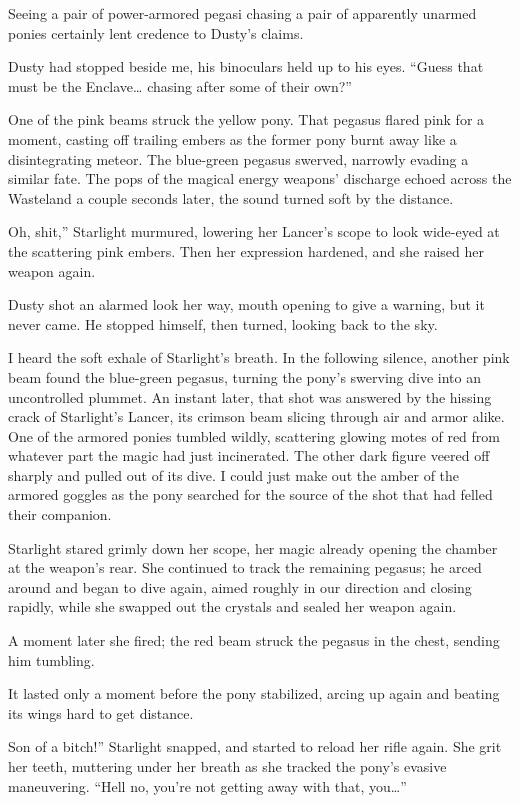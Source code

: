 Seeing a pair of power-armored pegasi chasing a pair of apparently unarmed ponies certainly lent credence to Dusty’s claims.

Dusty had stopped beside me, his binoculars held up to his eyes. “Guess that must be the Enclave… chasing after some of their own?”

One of the pink beams struck the yellow pony. That pegasus flared pink for a moment, casting off trailing embers as the former pony burnt away like a disintegrating meteor. The blue-green pegasus swerved, narrowly evading a similar fate. The pops of the magical energy weapons’ discharge echoed across the Wasteland a couple seconds later, the sound turned soft by the distance.

\leavevmode{}Oh, shit,” Starlight murmured, lowering her Lancer’s scope to look wide-eyed at the scattering pink embers. Then her expression hardened, and she raised her weapon again.

Dusty shot an alarmed look her way, mouth opening to give a warning, but it never came. He stopped himself, then turned, looking back to the sky.

I heard the soft exhale of Starlight’s breath. In the following silence, another pink beam found the blue-green pegasus, turning the pony’s swerving dive into an uncontrolled plummet. An instant later, that shot was answered by the hissing crack of Starlight’s Lancer, its crimson beam slicing through air and armor alike. One of the armored ponies tumbled wildly, scattering glowing motes of red from whatever part the magic had just incinerated. The other dark figure veered off sharply and pulled out of its dive. I could just make out the amber of the armored goggles as the pony searched for the source of the shot that had felled their companion.

Starlight stared grimly down her scope, her magic already opening the chamber at the weapon’s rear. She continued to track the remaining pegasus; he arced around and began to dive again, aimed roughly in our direction and closing rapidly, while she swapped out the crystals and sealed her weapon again.

A moment later she fired; the red beam struck the pegasus in the chest, sending him tumbling.

It lasted only a moment before the pony stabilized, arcing up again and beating its wings hard to get distance.

\leavevmode{}Son of a bitch!” Starlight snapped, and started to reload her rifle again. She grit her teeth, muttering under her breath as she tracked the pony’s evasive maneuvering. “Hell no, you’re not getting away with that, you…”

